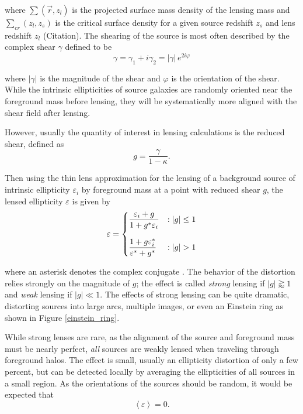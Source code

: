 \documentclass[%
 reprint,
 amsmath,amssymb,
 aps,nofootinbib
]{revtex4-1}
\begin{document}
\noindent where $\sum(\vec{r},z_l)$ is the projected surface mass density of the lensing mass and $\sum_{cr}(z_l,z_s)$ is the critical surface density for a given source redshift $z_s$ and lens redshift $z_l$ (Citation). The shearing of the source is most often described by the complex shear $\gamma$ defined to be
\begin{equation}\label{complex_shear}
\gamma=\gamma_1+i\gamma_2=|\gamma|\,e^{2i\varphi}
\end{equation}

\noindent where $|\gamma|$ is the magnitude of the shear and $\varphi$ is the orientation of the shear. While the intrinsic ellipticities of source galaxies are randomly oriented near the foreground mass before lensing, they will be systematically more aligned with the shear field after lensing.%

However, usually the quantity of interest in lensing calculations is the reduced shear, defined as
\begin{equation}\label{reduced_shear}
g=\frac{\gamma}{1-\kappa}.
\end{equation}

\noindent Then using the thin lens approximation for the lensing of a background source of intrinsic ellipticity $\varepsilon_i$ by foreground mass at a point with reduced shear $g$, the lensed ellipticity $\varepsilon$ is given by
\begin{equation}\label{lensing}
 \varepsilon = \begin{dcases}
      \frac{\varepsilon_i+g}{1+g^*\varepsilon_i} & : |g|\leq1 \\[0.75em]
       \frac{1+g\varepsilon_i^*}{\varepsilon^*+g^*} & : |g|>1
   \end{dcases}
\end{equation}

\noindent where an asterisk denotes the complex conjugate \cite{schneider}. The behavior of the distortion relies strongly on the magnitude of $g$; the
effect is called \textit{strong} lensing if $|g|\gtrapprox1$ and \textit{weak} lensing if $|g|\ll1$. The effects of strong lensing can be quite dramatic, distorting sources into large arcs, multiple images, or even an Einstein ring as shown in Figure \ref{einstein_ring}.

While strong lenses are rare, as the alignment of the source and foreground mass must be nearly perfect, \textit{all} sources are weakly lensed when traveling through foreground halos. The effect is small, usually an ellipticity distortion of only a few percent, but can be detected locally by averaging the ellipticities of all sources in a small region. As the orientations of the sources should be random, it would be expected that
$$\left<\varepsilon\right>=0.$$
\end{document}
